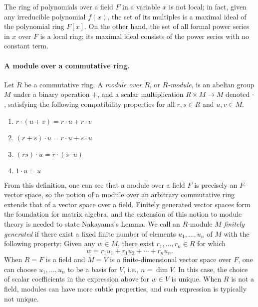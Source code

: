 \documentclass{article}
\begin{document}
The ring of polynomials over a field $F$ in a variable $x$ is not local; in fact, given any irreducible polynomial $f(x)$, the set of its multiples is a maximal ideal of the polynomial ring $F[x]$.
On the other hand, the set of all formal power series  in $x$ over $F$ is a local ring; its maximal ideal consists of the power series with no constant term. 


\paragraph{A module over a commutative ring.}  Let  $R$ be a commutative ring. 
A \emph{module over $R$}, or \emph{$R$-module}, is an abelian group $M$ under a binary operation $+$, and a {scalar multiplication} $R \times M \to M$ denoted $\cdot$, satisfying the following compatibility properties for all $r, s \in R$ and $u, v \in M$.

\begin{enumerate}[leftmargin=6cm,topsep=0cm,itemsep=0cm]
\item  $r \cdot (u + v)  = r \cdot u + r \cdot v$
\item $(r+s) \cdot u = r \cdot u + s \cdot u$
\item $(rs) \cdot u = r \cdot (s \cdot u)$
\item $1 \cdot u = u$ 
\end{enumerate}

From this definition, one can see that a module over a field $F$ is precisely an $F$-vector space, so the notion of a module over an arbitrary commutative ring extends that of a vector space over a field. 
Finitely generated vector spaces form the foundation for matrix algebra, and the extension of this notion to module theory is needed to state Nakayama's Lemma.  We call an $R$-module $M$ \emph{finitely generated} if there exist a fixed finite number of elements $u_1, \ldots, u_n$ of $M$ with the following property:  Given any  $w \in M$, there exist $r_1, \ldots, r_n \in R$ for which  
\[
w = r_1 u_1 + r_1 u_2 + \cdots + r_n u_n.
\]
When $R=F$ is a field and $M=V$ is a finite-dimensional vector space over $F$, one can choose $u_1, \ldots, u_n$ to be a basis for $V$, i.e., $n = \dim V$.  In this case, the choice of scalar coefficients in the expression above for $w \in V$ is unique.  When $R$ is not a field, modules can have more subtle properties, and such expression is typically not unique. 
\end{document}
